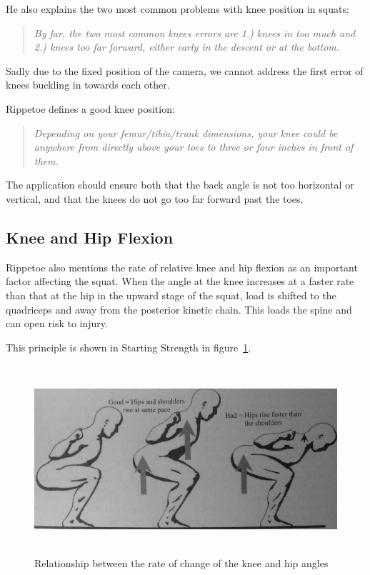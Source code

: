 He also explains the two most common problems with knee position in squats:

\begin{quote}
\emph{By far, the two most common knees errors are 1.) knees in too much and 2.) knees too far forward, either early in the descent or at the bottom.}
\end{quote}

Sadly due to the fixed position of the camera, we cannot address the first error of knees buckling in towards each other.

Rippetoe defines a good knee position:

\begin{quote}
\emph{Depending on your femur/tibia/trunk dimensions, your knee could be anywhere from directly above your toes to three or four inches in front of them.}
\end{quote}

The application should ensure both that the back angle is not too horizontal or vertical, and that the knees do not go too far forward past the toes.

\subsection{Knee and Hip Flexion}

Rippetoe also mentions the rate of relative knee and hip flexion as an important factor affecting the squat. When the angle at the knee increases at a faster rate than that at the hip in the upward stage of the squat, load is shifted to the quadriceps and away from the posterior kinetic chain. This loads the spine and can open risk to injury.

This principle is shown in Starting Strength in figure~\ref{fig:rippetoe_flexion}.

\begin{figure}[H]
    \centering
	\includegraphics[height=7cm]{squat/images/rippetoe_knee_hip_flexion}
\caption{Relationship between the rate of change of the knee and hip angles}
\label{fig:rippetoe_flexion}
\end{figure}

